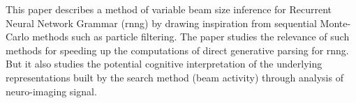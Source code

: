 This paper describes a method of variable beam size inference for Recurrent Neural Network Grammar (rnng) by drawing inspiration from sequential Monte-Carlo methods such as particle filtering. The paper studies the relevance of such methods for speeding up the computations of direct generative parsing for rnng. But it also studies the potential cognitive interpretation of the underlying representations built by the search method (beam activity) through analysis of neuro-imaging signal.
